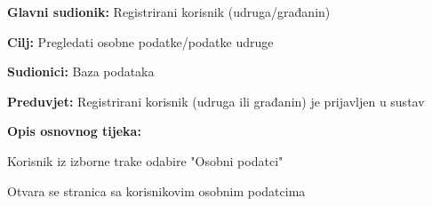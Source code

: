 		
				\noindent {}
			\begin{packed_item}
				
				\item \textbf{Glavni sudionik:} Registrirani korisnik (udruga/građanin)
				\item  \textbf{Cilj:} Pregledati osobne podatke/podatke udruge
				\item  \textbf{Sudionici:} Baza podataka
				\item  \textbf{Preduvjet:} Registrirani korisnik (udruga ili građanin) je prijavljen u sustav
				\item  \textbf{Opis osnovnog tijeka:}
				
				\item[] \begin{packed_enum}	
					\item Korisnik iz izborne trake odabire "Osobni podatci"
					\item Otvara se stranica sa korisnikovim osobnim podatcima
				\end{packed_enum}
			\end{packed_item}
		
		
		

